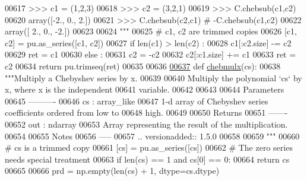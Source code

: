 \begin{DoxyCode}
00617 \textcolor{stringliteral}{    >>> c1 = (1,2,3)}
00618 \textcolor{stringliteral}{    >>> c2 = (3,2,1)}
00619 \textcolor{stringliteral}{    >>> C.chebsub(c1,c2)}
00620 \textcolor{stringliteral}{    array([-2.,  0.,  2.])}
00621 \textcolor{stringliteral}{    >>> C.chebsub(c2,c1) # -C.chebsub(c1,c2)}
00622 \textcolor{stringliteral}{    array([ 2.,  0., -2.])}
00623 \textcolor{stringliteral}{}
00624 \textcolor{stringliteral}{    """}
00625     \textcolor{comment}{# c1, c2 are trimmed copies}
00626     [c1, c2] = pu.as\_series([c1, c2])
00627     \textcolor{keywordflow}{if} len(c1) > len(c2) :
00628         c1[:c2.size] -= c2
00629         ret = c1
00630     \textcolor{keywordflow}{else} :
00631         c2 = -c2
00632         c2[:c1.size] += c1
00633         ret = c2
00634     \textcolor{keywordflow}{return} pu.trimseq(ret)
00635 
00636 
\hypertarget{chebyshev_8py_source_l00637}{}\hyperlink{namespacepyneb_1_1utils_1_1chebyshev_ab09f8accee50bd964e03071a659a7b5f}{00637} \textcolor{keyword}{def }\hyperlink{namespacepyneb_1_1utils_1_1chebyshev_ab09f8accee50bd964e03071a659a7b5f}{chebmulx}(cs):
00638     \textcolor{stringliteral}{"""Multiply a Chebyshev series by x.}
00639 \textcolor{stringliteral}{}
00640 \textcolor{stringliteral}{    Multiply the polynomial `cs` by x, where x is the independent}
00641 \textcolor{stringliteral}{    variable.}
00642 \textcolor{stringliteral}{}
00643 \textcolor{stringliteral}{}
00644 \textcolor{stringliteral}{    Parameters}
00645 \textcolor{stringliteral}{    ----------}
00646 \textcolor{stringliteral}{    cs : array\_like}
00647 \textcolor{stringliteral}{        1-d array of Chebyshev series coefficients ordered from low to}
00648 \textcolor{stringliteral}{        high.}
00649 \textcolor{stringliteral}{}
00650 \textcolor{stringliteral}{    Returns}
00651 \textcolor{stringliteral}{    -------}
00652 \textcolor{stringliteral}{    out : ndarray}
00653 \textcolor{stringliteral}{        Array representing the result of the multiplication.}
00654 \textcolor{stringliteral}{}
00655 \textcolor{stringliteral}{    Notes}
00656 \textcolor{stringliteral}{    -----}
00657 \textcolor{stringliteral}{    .. versionadded:: 1.5.0}
00658 \textcolor{stringliteral}{}
00659 \textcolor{stringliteral}{    """}
00660     \textcolor{comment}{# cs is a trimmed copy}
00661     [cs] = pu.as\_series([cs])
00662     \textcolor{comment}{# The zero series needs special treatment}
00663     \textcolor{keywordflow}{if} len(cs) == 1 \textcolor{keywordflow}{and} cs[0] == 0:
00664         \textcolor{keywordflow}{return} cs
00665 
00666     prd = np.empty(len(cs) + 1, dtype=cs.dtype)

\end{DoxyCode}
